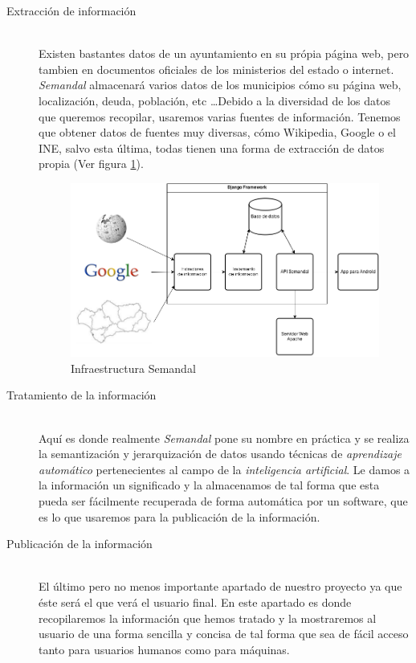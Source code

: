 \vspace{-5mm}
\begin{description}
	\item[Extracción de información] \hfill \\
		Existen bastantes datos de un ayuntamiento en su própia página web, pero tambien en documentos oficiales de los ministerios del estado o internet. \textit{Semandal} almacenará varios datos de los municipios cómo su página web, localización, deuda, población, etc \ldots  Debido a la diversidad de los datos que queremos recopilar, usaremos varias fuentes de información. Tenemos que obtener datos de fuentes muy diversas, cómo Wikipedia, Google o el INE, salvo esta última, todas tienen una forma de extracción de datos propia (Ver figura \ref{arquitecturaIntroduccion}).

\begin{figure}
\centering
\includegraphics[scale=0.5]{./01_Resumen/ArquitecturaSemandalv5.png}
\caption{Infraestructura Semandal}
\label{arquitecturaIntroduccion}
\end{figure}




	\item [Tratamiento de la información] \hfill \\
		Aquí es donde realmente \textit{Semandal} pone su nombre en práctica y se realiza la semantización y jerarquización de datos usando técnicas de \textit{aprendizaje automático} pertenecientes al campo de la \textit{inteligencia artificial}. Le damos a la información un significado y la almacenamos de tal forma que esta pueda ser fácilmente recuperada de forma automática por un software, que es lo que usaremos para la publicación de la información.

	\item[Publicación de la información] \hfill \\
		El último pero no menos importante apartado de nuestro proyecto ya que éste será el que verá el usuario final. En este apartado es donde recopilaremos la información que hemos tratado y la mostraremos al usuario de una forma sencilla y concisa de tal forma que sea de fácil acceso tanto para usuarios humanos como para máquinas. 
		
\end{description}

